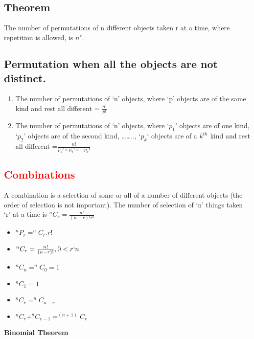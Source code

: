 \documentclass{article}
\begin{document}
\begin{multicols}{2}
\subsection*{Theorem}
The number of permutations of n different objects taken r at a time,
where repetition is allowed, is $n^r$.
\subsection*{Permutation when all the objects are not distinct.}
\begin{enumerate}
    \item The number of permutations of ‘n’ objects, where ‘p’ objects are of the same kind and rest all different = $\frac{n!}{p!}$
    \item  The number of permutations of ‘n’ objects, where ‘$p_1$’ objects are of one kind, ‘$p_2$’ objects are of the second kind, …….., ‘$p_k$‘ objects are of a $k^{th}$ kind and rest all different =$\frac{n!}{p_1! \times p_2! \times \dots p_k!}$
\end{enumerate}

\subsection*{\textcolor{red}{Combinations}}
A combination is a selection of some or all of a number of different objects (the order of selection is not important). The number of selection of ‘n’ things taken ‘r’ at a time is $^nC_r=\frac{n!}{(n-r)!r!}$

\begin{itemize}
    \item $^nP_r=^nC_r .r!$
    \item $^nC_r=\frac{n!}{(n-r)!}, 0 <r \lq n $ 
    \item $^nC_n=^nC_0=1$
    \item $^nC_1=1$
    \item $^nC_r=^nC_{n-r}$
    \item $^nC_r+^nC_{r-1}=^{(n+1)}C_r$
\end{itemize}

\end{multicols}











\begin{center}
    {\LARGE \textbf{Binomial Theorem} }
\end{center}
\end{document}
